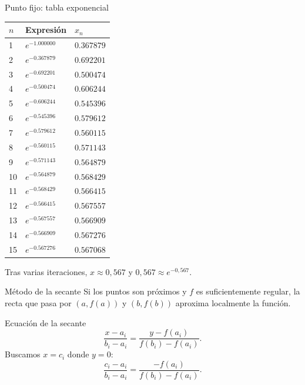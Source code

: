 \documentclass[original_version/main.tex]{subfiles}
\begin{document}
\begin{frame}{Punto fijo: tabla exponencial}
{\scriptsize\setlength{\tabcolsep}{5pt}\begin{center}\begin{tabular}{|C{.08\textwidth}|C{.34\textwidth}|C{.25\textwidth}|}\hline $n$ & Expresión & $x_n$\\\hline
\rule{0pt}{2.6mm}1 & $e^{-1.000000}$ & $0.367879$\\\hline
\rule{0pt}{2.6mm}2 & $e^{-0.367879}$ & $0.692201$\\\hline
\rule{0pt}{2.6mm}3 & $e^{-0.692201}$ & $0.500474$\\\hline
\rule{0pt}{2.6mm}4 & $e^{-0.500474}$ & $0.606244$\\\hline
\rule{0pt}{2.6mm}5 & $e^{-0.606244}$ & $0.545396$\\\hline
\rule{0pt}{2.6mm}6 & $e^{-0.545396}$ & $0.579612$\\\hline
\rule{0pt}{2.6mm}7 & $e^{-0.579612}$ & $0.560115$\\\hline
\rule{0pt}{2.6mm}8 & $e^{-0.560115}$ & $0.571143$\\\hline
\rule{0pt}{2.6mm}9 & $e^{-0.571143}$ & $0.564879$\\\hline
\rule{0pt}{2.6mm}10 & $e^{-0.564879}$ & $0.568429$\\\hline
\rule{0pt}{2.6mm}11 & $e^{-0.568429}$ & $0.566415$\\\hline
\rule{0pt}{2.6mm}12 & $e^{-0.566415}$ & $0.567557$\\\hline
\rule{0pt}{2.6mm}13 & $e^{-0.567557}$ & $0.566909$\\\hline
\rule{0pt}{2.6mm}14 & $e^{-0.566909}$ & $0.567276$\\\hline
\rule{0pt}{2.6mm}15 & $e^{-0.567276}$ & $0.567068$\\\hline
\end{tabular}\end{center}}\footnotesize Tras varias iteraciones, $x\approx0{,}567$ y $0{,}567\approx e^{-0{,}567}$.
\end{frame}

\begin{frame}{Método de la secante}
Si los puntos son próximos y $f$ es suficientemente regular, la recta que pasa por $(a,f(a))$ y $(b,f(b))$ aproxima localmente la función.
\end{frame}

\begin{frame}{Ecuación de la secante}
\[\frac{x-a_i}{b_i-a_i}=\frac{y-f(a_i)}{f(b_i)-f(a_i)}.\]Buscamos $x=c_i$ donde $y=0$:\[\frac{c_i-a_i}{b_i-a_i}=\frac{-f(a_i)}{f(b_i)-f(a_i)}.\]
\end{frame}
\end{document}
